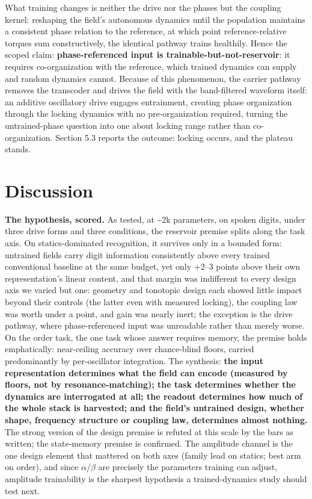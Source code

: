 \documentclass{article}
\makeatletter
\newcommand{\iclr@floatbarrier}{\par\vspace{\z@}%
  \ifx\@deferlist\@empty\else\clearpage\fi}
\let\iclr@section\section
\renewcommand{\section}{\iclr@floatbarrier\iclr@section}
\makeatother
\begin{document}
What training changes is neither the drive nor the phases but the
coupling kernel: reshaping the field's autonomous dynamics until the
population maintains a consistent phase relation to the reference, at
which point reference-relative torques sum constructively, the identical
pathway trains healthily. Hence the scoped claim:
\textbf{phase-referenced input is trainable-but-not-reservoir}: it
requires co-organization with the reference, which trained dynamics can
supply and random dynamics cannot. Because of this phenomenon, the
carrier pathway removes the transcoder and drives the field with the
band-filtered waveform itself: an additive oscillatory drive engages
entrainment, creating phase organization through the locking dynamics
with no pre-organization required, turning the untrained-phase question
into one about locking range rather than co-organization. Section 5.3
reports the outcome: locking occurs, and the plateau stands.

\section{Discussion}\label{discussion}

\textbf{The hypothesis, scored.} As tested, at \textasciitilde2k
parameters, on spoken digits, under three drive forms and three
conditions, the reservoir premise splits along the task axis. On
statics-dominated recognition, it survives only in a bounded form:
untrained fields carry digit information consistently above every
trained conventional baseline at the same budget, yet only +2--3 points
above their own representation's linear content, and that margin was
indifferent to every design axis we varied but one: geometry and
tonotopic design each showed little impact beyond their controls (the
latter even with measured locking), the coupling law was worth under a
point, and gain was nearly inert; the exception is the drive pathway,
where phase-referenced input was unreadable rather than merely worse. On
the order task, the one task whose answer requires memory, the premise
holds emphatically: near-ceiling accuracy over chance-blind floors,
carried predominantly by per-oscillator integration. The synthesis:
\textbf{the input representation determines what the field can encode
(measured by floors, not by resonance-matching); the task determines
whether the dynamics are interrogated at all; the readout determines how
much of the whole stack is harvested; and the field's untrained design,
whether shape, frequency structure or coupling law, determines almost
nothing.} The strong version of the design premise is refuted at this
scale by the bars as written; the state-memory premise is confirmed. The
amplitude channel is the one design element that mattered on both axes
(family lead on statics; best arm on order), and since
\ensuremath{\alpha}/\ensuremath{\beta} are precisely the parameters
training can adjust, amplitude trainability is the sharpest hypothesis a
trained-dynamics study should test next.
\end{document}
